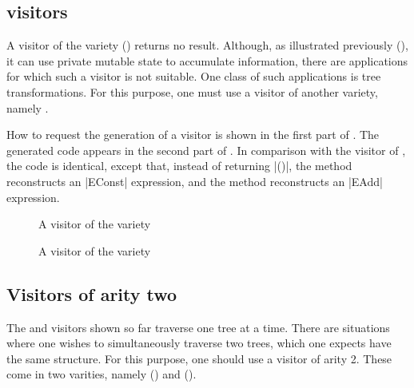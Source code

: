 \documentclass[11pt,a4paper,twoside]{article}
\begin{document}
\subsection{\map visitors}
\label{sec:intro:map}

A visitor of the \iter variety () returns no result.
Although, as illustrated previously (), it can use
private mutable state to accumulate information, there are applications for
which such a visitor is not suitable. One class of such applications is tree
transformations. For this purpose, one must use a visitor of another variety,
namely \map.

How to request the generation of a \map visitor is shown in the first part of
. The generated code appears in the second part of
. In comparison with the \iter visitor of ,
the code is identical, except that, instead of returning \oc|()|, the method
 reconstructs an \oc|EConst| expression, and the method
 reconstructs an \oc|EAdd| expression.



\begin{figure}[p]
\vspace{-\baselineskip}
\caption{A visitor of the \itertwo variety}
\label{fig:expr02}
\end{figure}

\begin{figure}[p]
\vspace{-\baselineskip}
\caption{A visitor of the \maptwo variety}
\label{fig:expr03}
\end{figure}

\subsection{Visitors of arity two}
\label{sec:intro:aritytwo}

The \iter and \map visitors shown so far traverse one tree at a time. There
are situations where one wishes to simultaneously traverse two trees, which
one expects have the same structure. For this purpose, one should use a
visitor of arity 2. These come in two varities, namely \itertwo
() and \maptwo ().
\end{document}
